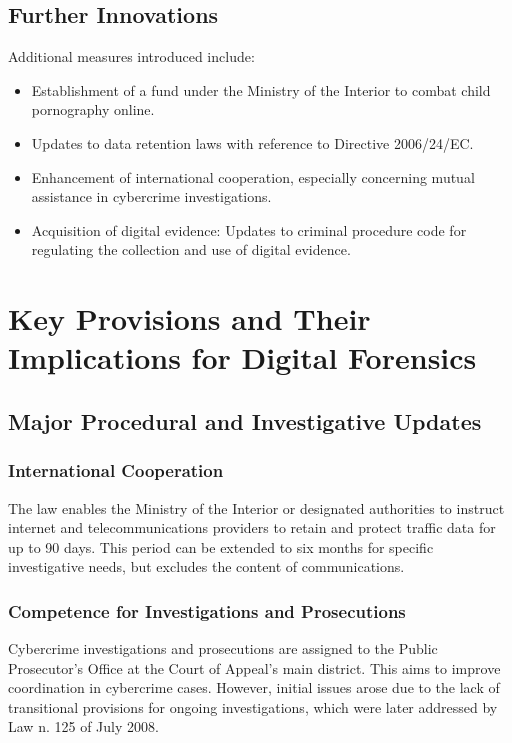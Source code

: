 \subsection{Further Innovations}

Additional measures introduced include:

\begin{itemize}
    \item Establishment of a fund under the Ministry of the Interior to combat child pornography online.
    \item Updates to data retention laws with reference to Directive 2006/24/EC.
    \item Enhancement of international cooperation, especially concerning mutual assistance in cybercrime investigations.
    \item Acquisition of digital evidence: Updates to criminal procedure code for regulating the collection and use of digital evidence.
\end{itemize}

\section{Key Provisions and Their Implications for Digital Forensics}

\subsection{Major Procedural and Investigative Updates}

\subsubsection{International Cooperation}
The law enables the Ministry of the Interior or designated authorities to instruct internet and telecommunications providers to retain and protect traffic data for up to 90 days. This period can be extended to six months for specific investigative needs, but excludes the content of communications.

\subsubsection{Competence for Investigations and Prosecutions}
Cybercrime investigations and prosecutions are assigned to the Public Prosecutor’s Office at the Court of Appeal’s main district. This aims to improve coordination in cybercrime cases. However, initial issues arose due to the lack of transitional provisions for ongoing investigations, which were later addressed by Law n. 125 of July 2008.

